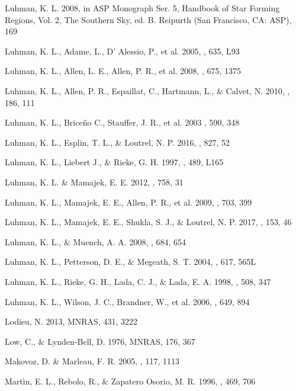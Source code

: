 \documentclass{emulateapj}
\begin{document}
\begin{thebibliography}{}
Luhman, K. L. 2008, in ASP Monograph Ser. 5, Handbook of Star Forming
Regions, Vol. 2, The Southern Sky, ed. B. Reipurth (San Francisco, CA: ASP), 169

Luhman, K. L., Adame, L., D' Alessio, P., et al. 2005, \apj, 635, L93

Luhman, K. L., Allen, L. E., Allen, P. R., et al. 2008, \apj, 675, 1375

Luhman, K. L., Allen, P. R., Espaillat, C., Hartmann, L., \& Calvet, N.
2010, \apjs, 186, 111

Luhman, K. L., Brice\~no C., Stauffer, J. R., et al. 2003 \apj, 590, 348

Luhman, K. L., Esplin, T. L., \& Loutrel, N. P. 2016, \apj, 827, 52

Luhman, K. L., Liebert J., \& Rieke, G. H. 1997, \apjl, 489, L165

Luhman, K. L. \& Mamajek, E. E. 2012, \apj, 758, 31

Luhman, K. L., Mamajek, E. E., Allen, P. R., et al. 2009, \apj, 703, 399

Luhman, K. L., Mamajek, E. E., Shukla, S. J., \& Loutrel, N. P. 2017, \aj, 153, 46

Luhman, K. L., \& Muench, A. A. 2008, \apj, 684, 654

Luhman, K. L., Petterson, D. E., \& Megeath, S. T. 2004, \apj, 617, 565L

Luhman, K. L., Rieke, G. H., Lada, C. J., \& Lada, E. A. 1998, \apj, 508, 347 

Luhman, K. L., Wilson, J. C., Brandner, W., et al. 2006, \apj, 649, 894

Lodieu, N. 2013, MNRAS, 431, 3222

Low, C., \& Lynden-Bell, D. 1976, MNRAS, 176, 367

Makovoz, D. \& Marleau, F. R. 2005, \pasp, 117, 1113

Mart\`in, E. L., Rebolo, R., \& Zapatero Osorio, M. R. 1996, \apj, 469, 706


\end{thebibliography}
\end{document}

